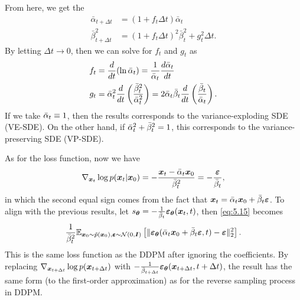 From here, we get the  
\begin{align}
    \bar{\alpha}_{t+\Delta t} &= (1+f_t \Delta t)\bar{\alpha}_{t} \nonumber \\
    \bar{\beta}^{2}_{t+\Delta t} &=(1+f_t \Delta t)^2\bar{\beta}_{t}^2+g_t^2 \Delta t.\label{eq:5.20}
\end{align}
By letting $\Delta t\to 0$, then we can solve for $f_t$ and $g_t$ as 
\begin{align}
    f_t &= \frac{d}{dt}(\ln \bar{\alpha}_t)=\frac{1}{\bar{\alpha}_t}\frac{d\bar{\alpha}_t}{dt}\nonumber\\
    g_t &= \bar{\alpha}_t^2\frac{d}{dt}\left(\frac{\bar{\beta}_t^2}{\bar{\alpha}_t^2}\right)=2\bar{\alpha}_t\bar{\beta}_t\frac{d}{dt}\left(\frac{\bar{\beta}_t}{\bar{\alpha}_t} \right). \label{eq:5.21}
\end{align}
If we take $\bar{\alpha}_t\equiv 1$, then the results corresponds to the variance-exploding SDE (VE-SDE). On the other hand, if $\bar{\alpha}_t^2+\bar{\beta}_t^2=1$, this corresponds to the variance-preserving SDE (VP-SDE).

As for the loss function, now we have 
\begin{equation}
    \label{eq:5.22}
    \nabla_{\bm{x}_t}\log p(\bm{x}_{t}|\bm{x}_0) =-\frac{\bm{x}_{t}-\bar{\alpha}_t\bm{x}_0}{\bar{\beta}_t^2}=-\frac{\bm{\varepsilon}}{\bar{\beta}_t},
\end{equation}
in which the second equal sign comes from the fact that $\bm{x}_{t}=\bar{\alpha}_t\bm{x}_0+\bar{\beta}_t\bm{\varepsilon}$. To align with the previous results, let $s_{\bm{\theta}}=-\frac{1}{\bar{\beta}_t}\bm{\varepsilon}_{\bm{\theta}}(\bm{x}_{t},t)$, then \cref{eq:5.15} becomes
\begin{equation}
    \label{eq:5.23}
\frac{1}{\bar{\beta}_t^2}\mathbb{E}_{\bm{x}_0\sim\tilde{p}(\bm{x}_0),\bm{\varepsilon}\sim\mathcal{N}(0,\bm{I})}\left[ \| \bm{\varepsilon}_{\bm{\theta}}(\bar{\alpha}_t\bm{x}_0+\bar{\beta}_t\bm{\varepsilon},t)-\bm{\varepsilon} \|_2^2 \right].
\end{equation}
This is the same loss function as the DDPM after ignoring the coefficients. By replacing $\nabla_{\bm{x}_{t+\Delta t}} \log p(\bm{x}_{t+\Delta t})$ with $-\frac{1}{\bar{\beta}_{t+\Delta t}}\bm{\varepsilon}_{\bm{\theta}}(\bm{x}_{t+\Delta t},t+\Delta t)$, the result has the same form (to the first-order approximation) as for the reverse sampling process in DDPM. 